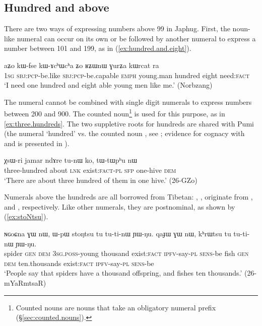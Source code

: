 \subsection{Hundred and above} \label{sec.hundred.plus}
There are two ways of expressing numbers above 99 in Japhug. First, the noun-like numeral  can occur on its own or be followed by another numeral to express a number between 101 and 199, as in (\ref{ex:hundred.and.eight}).

\begin{exe}
\ex \label{ex:hundred.and.eight}
\gll aʑo kɯ-fse kɯ-ɤcʰɯcʰa ʑo ʁʑɯnɯ ɣurʑa kɯrcat ra\\
\textsc{1sg} \textsc{sbj}:\textsc{pcp}-be.like  \textsc{sbj}:\textsc{pcp}-be.capable \textsc{emph} young.man hundred eight need:\textsc{fact} \\
\glt `I need one hundred and eight able young men like me.' (Norbzang)
\end{exe}

The numeral  cannot be combined with single digit numerals to express numbers between 200 and 900. The counted noun\footnote{Counted nouns are nouns that take an obligatory numeral prefix (§\ref{sec:counted.nouns}). }  is used for this purpose, as in \ref{ex:three.hundreds}. The two suppletive roots for hundreds are shared with Pumi (the numeral  `hundred' vs. the counted noun , see \citealt[101]{daudey14grammar}; evidence for cognacy with  and  is presented in \citealt{jacques17num}).
\largerpage
\begin{exe}
\ex \label{ex:three.hundreds}
\gll χsɯ-ri jamar ndɤre tu-nɯ ko, tɯ-tɯpʰu nɯ \\
three-hundred about \textsc{lnk} exist:\textsc{fact}-\textsc{pl} \textsc{sfp} one-hive \textsc{dem} \\
\glt `There are about three hundred of them in one hive.' (26-GZo)
\end{exe}
 
Numerals above the hundreds are all borrowed from Tibetan: , ,  originate from ,  and , respectively.  Like other numerals, they are postnominal, as shown by (\ref{ex:stoNtsu}).


\begin{exe}
\ex \label{ex:stoNtsu}
\gll ɴɢoɕna ɣɯ nɯ, ɯ-pɯ stoŋtsu tu tu-ti-nɯ ɲɯ-ŋu. qaɟɯ ɣɯ nɯ, kʰrɯtsu tu tu-ti-nɯ ɲɯ-ŋu. \\
spider \textsc{gen} \textsc{dem} \textsc{3sg}.\textsc{poss}-young thousand exist:\textsc{fact} \textsc{ipfv}-say-\textsc{pl} \textsc{sens}-be fish \textsc{gen} \textsc{dem} ten.thousands exist:\textsc{fact} \textsc{ipfv}-say-\textsc{pl} \textsc{sens}-be  \\
\glt `People say that spiders have a thousand offspring, and fishes ten thousands.' (26-mYaRmtsaR)
\end{exe}

